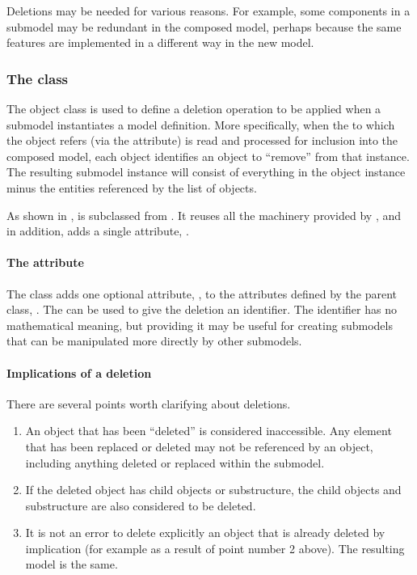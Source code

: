 Deletions may be needed for various reasons.  For example, some
components in a submodel may be redundant in the composed model, perhaps
because the same features are implemented in a different way in the
new model.


\subsubsection{The  class}
\label{deletion-class}

The \Deletion object class is used to define a deletion operation to be
applied when a submodel instantiates a model definition.  More
specifically, when the \Model to which the \Submodel object refers (via
the  attribute) is read and processed for inclusion into
the composed model, each \Deletion object identifies an object to
``remove'' from that \Model instance.  The resulting submodel instance
will consist of everything in the \Model object instance minus the
entities referenced by the list of \Deletion objects.

As shown in , \Deletion is subclassed from \SBaseRef.
It reuses all the machinery provided by \SBaseRef, and in addition, adds
a single attribute, .


\paragraph{The \hspace*{1pt} attribute}

The \Deletion class adds one optional attribute, , to the
attributes defined by the parent class, \SBaseRef.  The  can
be used to give the deletion an identifier.  The identifier has no
mathematical meaning, but providing it may be useful for creating
submodels that can be manipulated more directly by other submodels.


\paragraph{Implications of a deletion}

There are several points worth clarifying about deletions.

\begin{enumerate}

\item An object that has been ``deleted'' is considered inaccessible.
  Any element that has been replaced or deleted may not be referenced by
  an \SBaseRef object, including anything deleted or replaced within the
  submodel.

\item If the deleted object has child objects or substructure, the child
  objects and substructure are also considered to be deleted.

\item It is not an error to delete explicitly an object that is already
  deleted by implication (for example as a result of point number 2
  above).  The resulting model is the same.

\end{enumerate}

